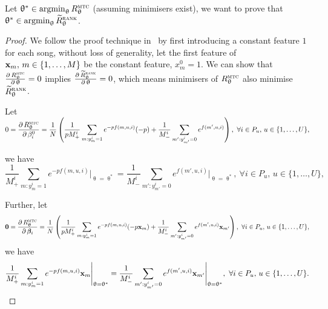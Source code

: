 Let $\uptheta^* \in \operatorname*{argmin}_{\uptheta} R_{\uptheta}^{\textsc{mtc}}$ (assuming minimisers exist),
we want to prove that $\uptheta^* \in \operatorname*{argmin}_{\uptheta} \widetilde R_{\uptheta}^{\textsc{rank}}$.

\begin{proof}
We follow the proof technique in~\cite{ertekin2011equivalence}
by first introducing a constant feature $1$ for each song,
without loss of generality, let the first feature of $\mathbf{x}_m, \, m \in \{1,\dots,M\}$ be the constant feature, \ie $x_m^0 = 1$.
We can show that
$\frac{\partial \, R_{\uptheta}^{\textsc{mtc}}} {\partial \, \uptheta} = 0$ implies
$\frac{\partial \, \widetilde R_{\uptheta}^{\textsc{rank}}} {\partial \, \uptheta} = 0$,
which means minimisers of $R_{\uptheta}^{\textsc{mtc}}$ also minimise $\widetilde R_{\uptheta}^{\textsc{rank}}$.

Let 
$
\displaystyle
0 
= \frac{\partial \, R_{\uptheta}^{\textsc{mtc}}} {\partial \, \beta_i^0}
= \frac{1}{N} \left( 
   \frac{1}{p M_+^i} \sum_{m: y_m^i = 1} e^{-p f(m, u, i)} (-p)
   + \frac{1}{M_-^i} \sum_{m': y_{m'}^i = 0} e^{f(m', u, i)} \right),
\ \forall i \in P_u, \, u \in \{1,\dots,U\},
$

we have
\begin{equation}
\label{eq:eq1}
\frac{1}{M_+^i} \sum_{m: y_m^i = 1} e^{-p f(m, u, i)} \Bigg|_{\uptheta = \uptheta^*}
= \frac{1}{M_-^i} \sum_{m': y_{m'}^i = 0} e^{f(m', u, i)} \Bigg|_{\uptheta = \uptheta^*}, 
\ \forall i \in P_u, \, u \in \{1,\dots,U\},
\end{equation}

Further, let
\begin{equation*}
\mathbf{0} 
= \frac{\partial \, R_{\uptheta}^{\textsc{mtc}}} {\partial \, {\bm{\beta}}_i} 
= \frac{1}{N} \left( 
   \frac{1}{p M_+^i} \sum_{m: y_m^i = 1} e^{-p f(m, u, i)} (-p \mathbf{x}_m)
   + \frac{1}{M_-^i} \sum_{m': y_{m'}^i = 0} e^{f(m', u, i)} \mathbf{x}_{m'} \right),
\ \forall i \in P_u, \, u \in \{1,\dots,U\},
\end{equation*}
we have
\begin{equation}
\label{eq:eq2}
\frac{1}{M_+^i} \sum_{m: y_m^i = 1} e^{-p f(m, u, i)} \mathbf{x}_m \Bigg|_{\uptheta = \uptheta^*}
= \frac{1}{M_-^i} \sum_{m': y_{m'}^i = 0} e^{f(m', u, i)} \mathbf{x}_{m'} \Bigg|_{\uptheta = \uptheta^*},
\ \forall i \in P_u, \, u \in \{1,\dots,U\}.
\end{equation}


\end{proof}
